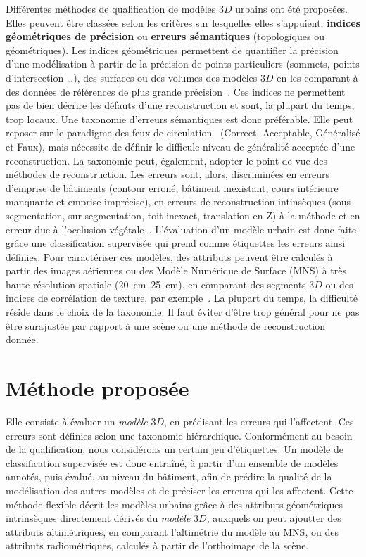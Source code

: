\documentclass[a4paper,french]{article}
\begin{document}
    Différentes méthodes de qualification de modèles $3D$ urbains ont été proposées. Elles peuvent être classées selon les critères sur lesquelles elles s'appuient: \textbf{indices géométriques de précision} ou \textbf{erreurs sémantiques} (topologiques ou géométriques). Les indices géométriques permettent de quantifier la précision d'une modélisation à partir de la précision de points {\color{red}particuliers} (sommets, points d'intersection \dots), des surfaces ou des volumes des modèles $3D$ en les comparant à des données de références de plus grande précision~\cite{Zeng2014}. Ces indices ne permettent pas de bien décrire les défauts d'une reconstruction et sont, la plupart du temps, trop locaux. Une taxonomie d'erreurs sémantiques est donc préférable. Elle peut reposer sur le paradigme des feux de circulation~\cite{boudet2006supervised} (Correct, Acceptable, Généralisé et Faux){\color{red}, mais nécessite de définir le difficule niveau de généralité acceptée d'une reconstruction. La taxonomie peut, également,} adopter le point de vue des méthodes de reconstruction. Les erreurs sont, alors, discriminées en erreurs d'emprise de bâtiments (contour erroné, bâtiment inexistant, cours intérieure manquante et emprise imprécise), en erreurs de reconstruction intinsèques (sous-segmentation, sur-segmentation, toit inexact, translation en Z) à la méthode et en erreur due à l'occlusion végétale~\cite{Michelin2013}. L'évaluation d'un modèle urbain est donc faite grâce une classification supervisée qui prend comme étiquettes les erreurs ainsi définies. Pour caractériser ces modèles, des attributs peuvent être calculés à partir des images aériennes ou des Modèle Numérique de Surface (MNS) à très haute résolution spatiale (\SIrange{20}{25}{\cm}), en comparant des segments $3D$ ou des indices de corrélation de texture, par exemple{\color{red}~\cite{boudet2006supervised, Michelin2013}. La plupart du temps, la difficulté réside dans le choix de la taxonomie. Il faut éviter} d'être trop général pour ne pas être surajustée par rapport à une scène ou une méthode de reconstruction donnée.

    \section{Méthode proposée}

    Elle consiste à évaluer un \textit{modèle} $3D$, en prédisant les erreurs qui l'affectent. Ces erreurs sont définies selon une taxonomie hiérarchique. Conformément au besoin de la qualification, nous considérons un certain jeu d'étiquettes. Un modèle de classification supervisée est donc entraîné, à partir d'un ensemble de modèles annotés, puis évalué{\color{red}, au niveau du bâtiment,} afin de prédire la qualité de la modélisation des autres modèles et de préciser les erreurs qui les affectent. Cette méthode flexible décrit les modèles urbains grâce à des attributs géométriques intrinsèques directement dérivés du \textit{modèle} $3D$, auxquels on peut ajoutter des attributs altimétriques, en comparant l'altimétrie du modèle au MNS, ou des attributs radiométriques, calculés à partir de l'orthoimage de la scène.
\end{document}

